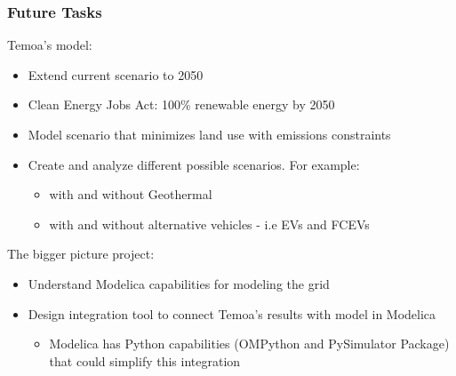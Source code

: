 \begin{frame}
\frametitle{Future Tasks}
	Temoa's model:
	\begin{itemize}
		\item Extend current scenario to 2050
		\item Clean Energy Jobs Act: 100\% renewable energy by 2050
		\item Model scenario that minimizes land use with emissions constraints
		\item Create and analyze different possible scenarios. For example:
			\begin{itemize}
				\item with and without Geothermal
				\item with and without alternative vehicles - i.e EVs and FCEVs
			\end{itemize}
	\end{itemize}	

    The bigger picture project:
	\begin{itemize}
		\item Understand Modelica capabilities for modeling the grid
		\item Design integration tool to connect Temoa's results with model in Modelica
		\begin{itemize}
			\item Modelica has Python capabilities (OMPython and PySimulator Package) that could simplify this integration
		\end{itemize}
	\end{itemize}
\end{frame}

